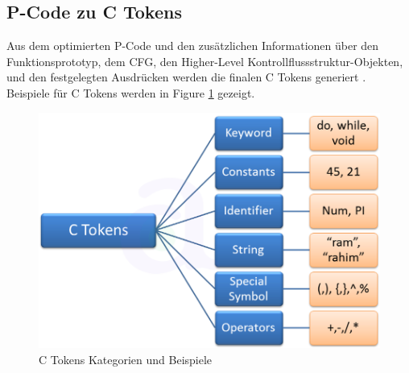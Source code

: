 




\subsection{P-Code zu C Tokens}

Aus dem optimierten P-Code und den zusätzlichen Informationen über den Funktionsprototyp, dem CFG, den Higher-Level Kontrollflussstruktur-Objekten, und den festgelegten Ausdrücken werden die finalen C Tokens generiert \cite{8}. Beispiele für C Tokens werden in Figure \ref{fig:ctokens} gezeigt.

\begin{figure}[!h]
	\centering
	\includegraphics[width=.45\textwidth]{img/ctokens.png}
	\caption{C Tokens Kategorien und Beispiele}
	\label{fig:ctokens}
\end{figure}



